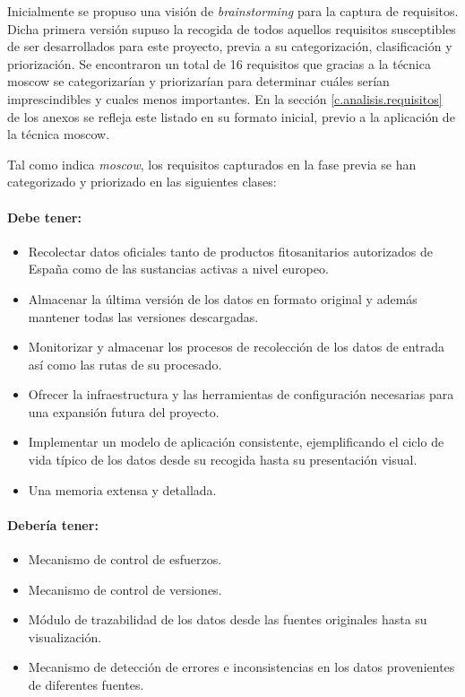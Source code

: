 \par Inicialmente se propuso una visión de \textit{brainstorming} para la captura de requisitos. Dicha primera versión supuso la recogida de todos aquellos requisitos susceptibles de ser desarrollados para este proyecto, previa a su categorización, clasificación y priorización. Se encontraron un total de 16 requisitos que gracias a la técnica \gls{moscow} se categorizarían y priorizarían para determinar cuáles serían imprescindibles y cuales menos importantes. En la sección \ref{c.analisis.requisitos} de los anexos se refleja este listado en su formato inicial, previo a la aplicación de la técnica \gls{moscow}.



Tal como indica \textit{\gls{moscow}}, los requisitos capturados en la fase previa se han categorizado y priorizado en las siguientes clases: 

\paragraph*{Debe tener:} 
\begin{itemize}
\item Recolectar datos oficiales tanto de productos fitosanitarios autorizados de España como de las sustancias activas a nivel europeo. 
\item Almacenar la última versión de los datos en formato original y además mantener todas las versiones descargadas. 
\item Monitorizar y almacenar los procesos de recolección de los datos de entrada así como las rutas de su procesado.
\item Ofrecer la infraestructura y las herramientas de configuración necesarias para una expansión futura del proyecto. 
\item Implementar un modelo de aplicación consistente, ejemplificando el ciclo de vida típico de los datos desde su recogida hasta su presentación visual. 
\item Una memoria extensa y detallada. 
\end{itemize}

\paragraph*{Debería tener:} 
\begin{itemize}
\item Mecanismo de control de esfuerzos.
\item Mecanismo de control de versiones.
\item Módulo de trazabilidad de los datos desde las fuentes originales hasta su visualización. 
\item Mecanismo de detección de errores e inconsistencias en los datos provenientes de diferentes fuentes. 
\end{itemize}


